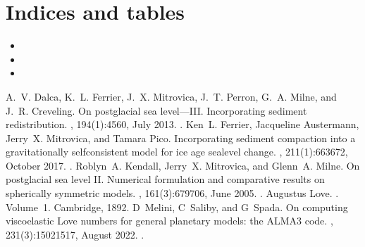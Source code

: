 \documentclass[letterpaper,10pt,english]{sphinxmanual}
\begin{document}
\chapter{Indices and tables}
\label{\detokenize{index:indices-and-tables}}\begin{itemize}
\item {} 
\sphinxAtStartPar
{}

\item {} 
\sphinxAtStartPar
{}

\item {} 
\sphinxAtStartPar
{}

\end{itemize}

\begin{sphinxthebibliography}{1}
\sphinxAtStartPar
A. V. Dalca, K. L. Ferrier, J. X. Mitrovica, J. T. Perron, G. A. Milne, and J. R. Creveling. On postglacial sea level—III. Incorporating sediment redistribution. , 194(1):45\textendash{}60, July 2013. .
\sphinxAtStartPar
Ken L. Ferrier, Jacqueline Austermann, Jerry X. Mitrovica, and Tamara Pico. Incorporating sediment compaction into a gravitationally self\sphinxhyphen{}consistent model for ice age sea\sphinxhyphen{}level change. , 211(1):663\textendash{}672, October 2017. .
\sphinxAtStartPar
Roblyn A. Kendall, Jerry X. Mitrovica, and Glenn A. Milne. On post\sphinxhyphen{}glacial sea level \sphinxhyphen{} II. Numerical formulation and comparative results on spherically symmetric models. , 161(3):679\textendash{}706, June 2005. .
\sphinxAtStartPar
Augustus Love. . Volume 1. Cambridge, 1892.
\sphinxAtStartPar
D Melini, C Saliby, and G Spada. On computing viscoelastic Love numbers for general planetary models: the ALMA3 code. , 231(3):1502\textendash{}1517, August 2022. .

\end{sphinxthebibliography}
\end{document}
